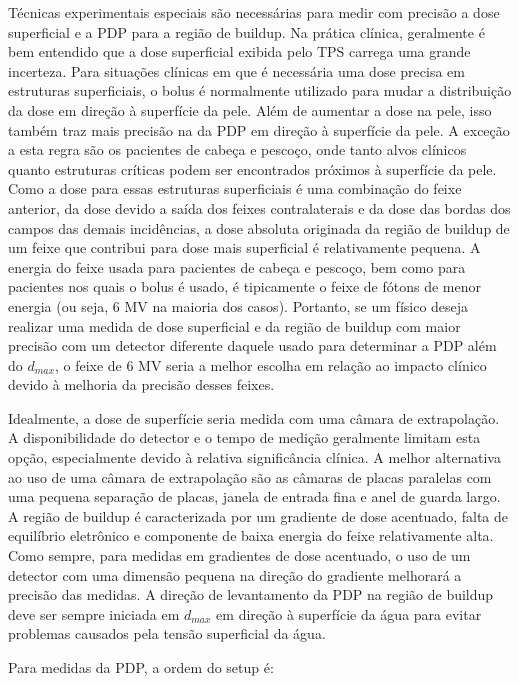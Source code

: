 \documentclass[11pt,a4paper]{article}
\begin{document}
	Técnicas experimentais especiais são necessárias para medir com precisão a dose superficial e a PDP para a região de buildup. Na prática clínica, geralmente é bem entendido que a dose superficial exibida pelo TPS carrega uma grande incerteza. Para situações clínicas em que é necessária uma dose precisa em estruturas superficiais, o bolus é normalmente utilizado para mudar a distribuição da dose em direção à superfície da pele. Além de aumentar a dose na pele, isso também traz  mais precisão na da PDP em direção à superfície da pele. A exceção a esta regra  são os pacientes de cabeça e pescoço, onde tanto alvos clínicos quanto estruturas críticas podem ser encontrados próximos à superfície da pele. Como a dose para essas estruturas superficiais é uma combinação do feixe anterior, da dose devido a saída dos feixes contralaterais e da dose das bordas dos campos das demais incidências, a dose absoluta originada da região de buildup de um feixe que contribui para dose mais superficial é relativamente pequena. A energia do feixe usada para pacientes de cabeça e pescoço, bem como para pacientes nos quais o bolus é usado, é tipicamente o feixe de fótons de menor energia (ou seja, 6 MV na maioria dos casos). Portanto, se um físico deseja realizar uma medida de dose superficial e da região de buildup com  maior precisão com um detector diferente daquele usado para determinar a PDP além do $d_{max}$, o feixe de 6 MV seria a melhor escolha em relação ao impacto clínico devido à melhoria da precisão desses feixes.

	Idealmente, a dose de superfície seria medida com uma câmara de extrapolação. A disponibilidade do detector e o tempo de medição geralmente limitam esta opção, especialmente devido à relativa significância clínica. A melhor alternativa ao uso de uma câmara de extrapolação são as câmaras de placas paralelas com uma pequena separação de placas, janela de entrada fina e anel de guarda largo. A região de buildup é caracterizada por um gradiente de dose acentuado, falta de equilíbrio eletrônico e componente de baixa energia do feixe relativamente alta. Como sempre, para medidas em gradientes de dose acentuado, o uso de um detector com uma dimensão pequena na direção do gradiente melhorará a precisão das medidas. A direção de levantamento da PDP na região de buildup deve ser sempre iniciada em $d_{max}$ em direção à superfície da água para evitar problemas causados pela tensão superficial da água.

	Para medidas da PDP, a ordem do setup é:
\end{document}
